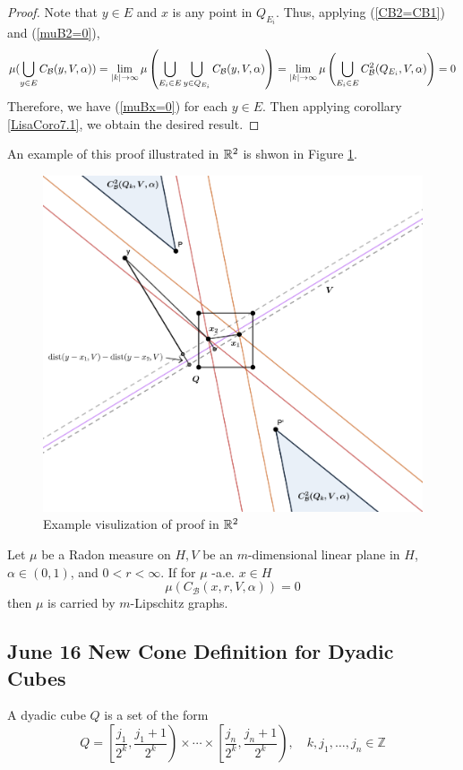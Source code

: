 \begin{proof}
Note that $y\in E$ and $x$ is any point in $Q_{E_i}$. Thus, applying (\ref{CB2=CB1}) and (\ref{muB2=0}), 
\begin{equation*}
    \begin{split}
        \mu(\bigcup_{y\in E}C_\mathcal B(y, V, \alpha))
        = \lim_{|k|\rightarrow \infty}\mu\left( \bigcup_{E_i\in E}\bigcup_{y\in Q_{E_i}} C_\mathcal B(y, V, \alpha) \right)  
        = \lim_{|k|\rightarrow\infty}\mu\left( \bigcup_{E_i\in E} C_\mathcal B^2(Q_{E_i}, V, \alpha) \right)
        = 0
    \end{split}
\end{equation*}
Therefore, we have (\ref{muBx=0}) for each $y\in E$. Then applying corollary \ref{LisaCoro7.1}, we obtain the desired result. 
\end{proof}



An example of this proof illustrated in $\mathbb{R}^2$ is shwon in Figure \ref{fig:CB1=CB2}.

\begin{figure}[H]
    \centering
    \includegraphics[width=.6\textwidth]{images/CB1=CB2.png}
    \caption{Example visulization of proof in $\mathbb{R}^2$}
    \label{fig:CB1=CB2}
\end{figure}


\begin{corollary}\label{LisaCoro7.1}
    Let $\mu$ be a Radon measure on $H, V$ be an $m$-dimensional linear plane in $H$, $\alpha \in(0,1)$, and $0<r<\infty$. If for $\mu$ -a.e. $x \in H$
   $$
   \mu\left(C_{\mathcal{B}}(x, r, V, \alpha)\right)=0
   $$
   then $\mu$ is carried by $m$-Lipschitz graphs.
\end{corollary}




\newpage
\subsection{June 16 New Cone Definition for Dyadic Cubes}
\begin{definition} A dyadic cube $Q$ is a set of the form
    \begin{equation}\label{equ:dyadiccube}
        Q=\left[\frac{j_{1}}{2^{k}}, \frac{j_{1}+1}{2^{k}}\right) \times \cdots \times\left[\frac{j_{n}}{2^{k}}, \frac{j_{n}+1}{2^{k}}\right), \quad k, j_{1}, \ldots, j_{n} \in \mathbb{Z}
    \end{equation}
\end{definition}

